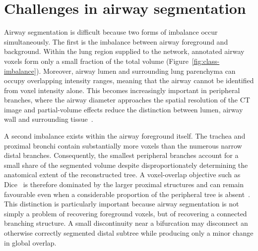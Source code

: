 \section{Challenges in airway segmentation}
\label{sec:challenges}

Airway segmentation is difficult because two forms of imbalance occur simultaneously. The
first is the imbalance between airway foreground and background. Within the lung region supplied to the
network, annotated airway voxels form only a small fraction of the total volume
(Figure~\ref{fig:class-imbalance}). Moreover,
airway lumen and surrounding lung parenchyma can occupy overlapping intensity ranges, meaning
that the airway cannot be identified from voxel intensity alone. This becomes increasingly
important in peripheral branches, where the airway diameter approaches the spatial resolution
of the CT image and partial-volume effects reduce the distinction between lumen, airway wall
and surrounding tissue~\cite{montaudon2007,GarciaUceda2021AirwayCNN}.

A second imbalance exists within the airway foreground itself. The trachea and proximal
bronchi contain substantially more voxels than the numerous narrow distal branches. Consequently, the smallest
peripheral branches account for a small share of the segmented volume despite disproportionately determining the anatomical
extent of the reconstructed tree. A voxel-overlap objective such as Dice~\cite{dice1945association} is therefore dominated by the larger proximal structures
and can remain favourable even when a considerable proportion of the peripheral tree is absent~\cite{zhang2023atm22,zheng2021gradient}. 
This distinction is particularly important because airway segmentation is not simply a problem of recovering
foreground voxels, but of recovering a connected branching structure. A small discontinuity near a bifurcation may disconnect an
otherwise correctly segmented distal subtree while producing only a minor change in global
overlap.

